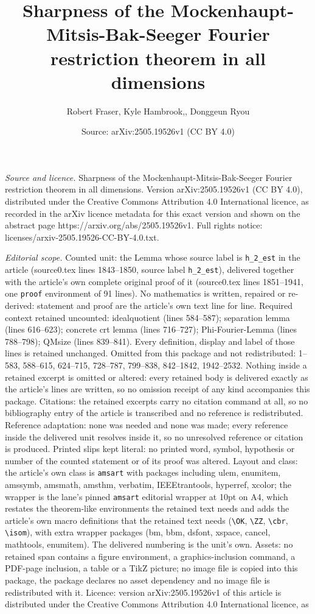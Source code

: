 \documentclass[10pt,a4paper]{amsart}
\title[Sharpness of the Mockenhaupt-Mitsis-Bak-Seeger Fourier restr]{Sharpness of the Mockenhaupt-Mitsis-Bak-Seeger Fourier restriction theorem in all dimensions}
\author{Robert Fraser, Kyle Hambrook,, Donggeun Ryou}
\date{Source: arXiv:2505.19526v1 (CC BY 4.0)}
\begin{document}
\maketitle

\noindent\emph{Source and licence.} Sharpness of the Mockenhaupt-Mitsis-Bak-Seeger Fourier restriction theorem in all dimensions. Version arXiv:2505.19526v1 (CC BY 4.0), distributed under the Creative Commons Attribution 4.0 International licence, as recorded in the arXiv licence metadata for this exact version and shown on the abstract page https://arxiv.org/abs/2505.19526v1. Full rights notice: licenses/arxiv-2505.19526-CC-BY-4.0.txt.\par\smallskip

\noindent\textit{Editorial scope.} Counted unit: the Lemma whose source label is \texttt{h\_2\_est} in the article (source0.tex lines 1843--1850, source label \texttt{h\_2\_est}), delivered together with the article's own complete original proof of it (source0.tex lines 1851--1941, one \texttt{proof} environment of 91 lines). No mathematics is written, repaired or re-derived: statement and proof are the article's own text line for line. Required context retained uncounted: idealquotient (lines 584--587); separation lemma (lines 616--623); concrete crt lemma (lines 716--727); Phi-Fourier-Lemma (lines 788--798); QMsize (lines 839--841). Every definition, display and label of those lines is retained unchanged. Omitted from this package and not redistributed: 1--583, 588--615, 624--715, 728--787, 799--838, 842--1842, 1942--2532. Nothing inside a retained excerpt is omitted or altered: every retained body is delivered exactly as the article's lines are written, so no omission receipt of any kind accompanies this package. Citations: the retained excerpts carry no citation command at all, so no bibliography entry of the article is transcribed and no reference is redistributed. Reference adaptation: none was needed and none was made; every reference inside the delivered unit resolves inside it, so no unresolved reference or citation is produced. Printed slips kept literal: no printed word, symbol, hypothesis or number of the counted statement or of its proof was altered. Layout and class: the article's own class is \texttt{amsart} with packages including ulem, enumitem, amssymb, amsmath, amsthm, verbatim, IEEEtrantools, hyperref, xcolor; the wrapper is the lane's pinned \texttt{amsart} editorial wrapper at 10pt on A4, which restates the theorem-like environments the retained text needs and adds the article's own macro definitions that the retained text needs (\texttt{\textbackslash OK}, \texttt{\textbackslash ZZ}, \texttt{\textbackslash cbr}, \texttt{\textbackslash isom}), with extra wrapper packages (bm, bbm, dsfont, xspace, cancel, mathtools, enumitem). The delivered numbering is the unit's own. Assets: no retained span contains a figure environment, a graphics-inclusion command, a PDF-page inclusion, a table or a TikZ picture; no image file is copied into this package, the package declares no asset dependency and no image file is redistributed with it. Licence: version arXiv:2505.19526v1 of this article is distributed under the Creative Commons Attribution 4.0 International licence, as 
\end{document}
